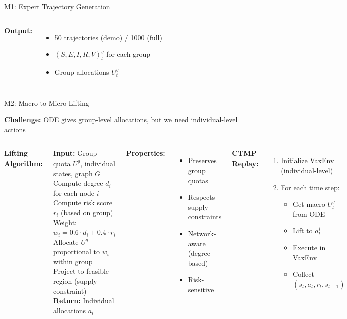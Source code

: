 \documentclass[aspectratio=169]{beamer}
\begin{document}
\begin{frame}{M1: Expert Trajectory Generation}
\begin{columns}
\vspace{0.5em}
\textbf{Output:}
\begin{itemize}
    \item 50 trajectories (demo) / 1000 (full)
    \item $(S,E,I,R,V)_t^g$ for each group
    \item Group allocations $U_t^g$
\end{itemize}

\end{columns}

\end{frame}

\begin{frame}{M2: Macro-to-Micro Lifting}

\textbf{Challenge:} ODE gives group-level allocations, but we need individual-level actions

\begin{columns}

\textbf{Lifting Algorithm:}
\begin{algorithmic}
\STATE \textbf{Input:} Group quota $U^g$, individual states, graph $G$
\STATE Compute degree $d_i$ for each node $i$
\STATE Compute risk score $r_i$ (based on group)
\STATE Weight: $w_i = 0.6 \cdot d_i + 0.4 \cdot r_i$
    \STATE Allocate $U^g$ proportional to $w_i$ within group
\ENDFOR
\STATE Project to feasible region (supply constraint)
\STATE \textbf{Return:} Individual allocations $a_i$
\end{algorithmic}

\vspace{0.5em}
\textbf{Properties:}
\begin{itemize}
    \item \checkmark Preserves group quotas
    \item \checkmark Respects supply constraints
    \item \checkmark Network-aware (degree-based)
    \item \checkmark Risk-sensitive
\end{itemize}


\textbf{CTMP Replay:}
\begin{enumerate}
    \item Initialize VaxEnv (individual-level)
    \item For each time step:
    \begin{itemize}
        \item Get macro $U_t^g$ from ODE
        \item Lift to $a_t^i$
        \item Execute in VaxEnv
        \item Collect $(s_t, a_t, r_t, s_{t+1})$
    \end{itemize}
\end{enumerate}


\end{columns}
\end{frame}
\end{document}
